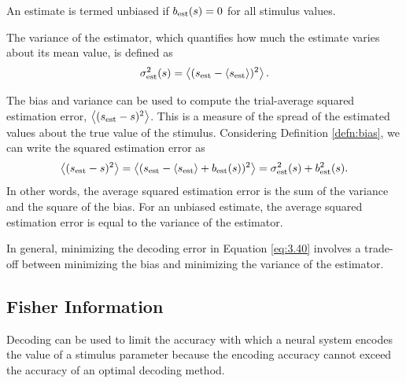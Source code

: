 \begin{defn}
  An estimate is termed unbiased if $b_{\rm{est}}(s)=0$ for all stimulus values.
\end{defn}

\begin{defn}
  The variance of the estimator, which quantifies how much the estimate
  varies about its mean value, is defined as
  \begin{equation}
    \label{eq:3.39}
    \sigma_{\rm{est}}^{2}(s)=\left\langle (s_{\rm{est}} -\left\langle s_{\rm{est}}  \right\rangle)^{2} \right\rangle.
  \end{equation}
\end{defn}

\begin{prop}
  The bias and variance can be used to compute the trial-average
  squared estimation error, $\left\langle (s_{\rm{est}} -s)^{2}\right\rangle$. This is a measure of the spread of the estimated values about the true value of the stimulus. Considering Definition \ref{defn:bias}, we can write the squared estimation error as
    \begin{equation}
      \label{eq:3.40}
      \left\langle (s_{\rm{est}} -s)^{2} \right\rangle=\left\langle (s_{\rm{est}} -\left\langle s_{\rm{est}}  \right\rangle+ b_{\rm{est}}(s))^{2} \right\rangle=\sigma_{\rm{est}}^{2}(s)+b_{\rm{est}}^{2}(s).
    \end{equation}
    In other words, the average squared estimation error is the sum of the
variance and the square of the bias. For an unbiased estimate, the average
squared estimation error is equal to the variance of the estimator.
\end{prop}

\begin{rem}
  In general, minimizing the decoding error in Equation
  \ref{eq:3.40} involves a trade-off between minimizing the bias and
  minimizing the variance of the estimator.
\end{rem}

\subsection{Fisher Information}
\begin{rem}
  Decoding can be used to limit the accuracy with which a neural system
encodes the value of a stimulus parameter because the encoding accuracy
cannot exceed the accuracy of an optimal decoding method.
\end{rem}

